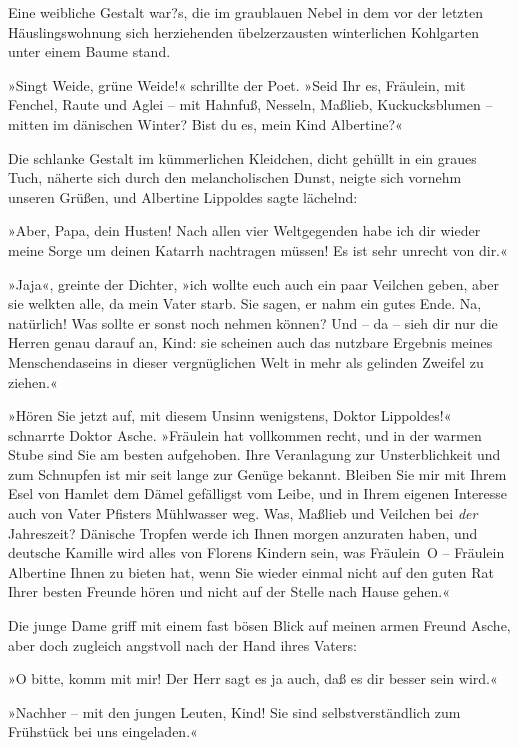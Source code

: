 Eine weibliche Gestalt war?s, die im graublauen Nebel in dem vor
der letzten Häuslingswohnung sich herziehenden übelzerzausten
winterlichen Kohlgarten unter einem Baume stand.

»Singt Weide, grüne Weide!« schrillte der Poet. »Seid Ihr es,
Fräulein, mit Fenchel, Raute und Aglei – mit Hahnfuß, Nesseln,
Maßlieb, Kuckucksblumen – mitten im dänischen Winter? Bist du es,
mein Kind Albertine?«

Die schlanke Gestalt im kümmerlichen Kleidchen, dicht gehüllt in
ein graues Tuch, näherte sich durch den melancholischen Dunst,
neigte sich vornehm unseren Grüßen, und Albertine Lippoldes sagte
lächelnd:

»Aber, Papa, dein Husten! Nach allen vier Weltgegenden habe ich dir
wieder meine Sorge um deinen Katarrh nachtragen müssen! Es ist sehr
unrecht von dir.«

»Jaja«, greinte der Dichter, »ich wollte euch auch ein paar
Veilchen geben, aber sie welkten alle, da mein Vater starb. Sie
sagen, er nahm ein gutes Ende. Na, natürlich! Was sollte er sonst
noch nehmen können? Und – da – sieh dir nur die Herren genau darauf
an, Kind: sie scheinen auch das nutzbare Ergebnis meines
Menschendaseins in dieser vergnüglichen Welt in mehr als gelinden
Zweifel zu ziehen.«

»Hören Sie jetzt auf, mit diesem Unsinn wenigstens, Doktor
Lippoldes!« schnarrte Doktor Asche. »Fräulein hat vollkommen recht,
und in der warmen Stube sind Sie am besten aufgehoben. Ihre
Veranlagung zur Unsterblichkeit und zum Schnupfen ist mir seit
lange zur Genüge bekannt. Bleiben Sie mir mit Ihrem Esel von Hamlet
dem Dämel gefälligst vom Leibe, und in Ihrem eigenen Interesse auch
von Vater Pfisters Mühlwasser weg. Was, Maßlieb und Veilchen bei
\emph{der} Jahreszeit? Dänische Tropfen werde ich Ihnen morgen
anzuraten haben, und deutsche Kamille wird alles von Florens
Kindern sein, was Fräulein~O – Fräulein Albertine Ihnen zu bieten
hat, wenn Sie wieder einmal nicht auf den guten Rat Ihrer besten
Freunde hören und nicht auf der Stelle nach Hause gehen.«

Die junge Dame griff mit einem fast bösen Blick auf meinen armen
Freund Asche, aber doch zugleich angstvoll nach der Hand ihres
Vaters:

»O bitte, komm mit mir! Der Herr sagt es ja auch, daß es dir besser
sein wird.«

»Nachher – mit den jungen Leuten, Kind! Sie sind selbstverständlich
zum Frühstück bei uns eingeladen.«

